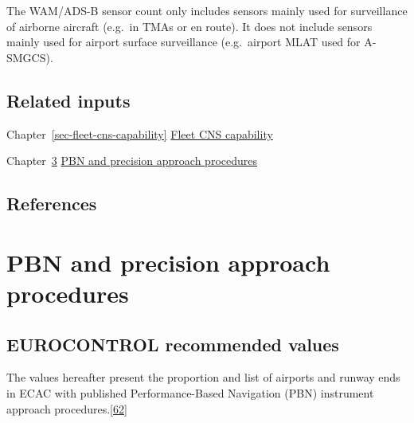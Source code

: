 \documentclass[
  11pt,
  a4paper,
]{book}
\begin{document}
The WAM/ADS-B sensor count only includes sensors mainly used for
surveillance of airborne aircraft (e.g.~in TMAs or en route). It does
not include sensors mainly used for airport surface surveillance
(e.g.~airport MLAT used for A-SMGCS).

\hypertarget{related-inputs-24}{%
\section{Related inputs}\label{related-inputs-24}}

Chapter~\ref{sec-fleet-cns-capability}
\protect\hyperlink{sec-fleet-cns-capability}{Fleet CNS capability}

Chapter~\ref{sec-pbn-and-precision-approach-procedures}
\protect\hyperlink{sec-pbn-and-precision-approach-procedures}{PBN and
precision approach procedures}

\hypertarget{references-29}{%
\section{References}\label{references-29}}

\hypertarget{sec-pbn-and-precision-approach-procedures}{%
\chapter{PBN and precision approach
procedures}\label{sec-pbn-and-precision-approach-procedures}}

\hypertarget{eurocontrol-recommended-values-31}{%
\section{EUROCONTROL recommended
values}\label{eurocontrol-recommended-values-31}}

The values hereafter present the proportion and list of airports and
runway ends in ECAC with published Performance-Based Navigation (PBN)
instrument approach
procedures.\protect\hyperlink{ref-pbn:tool}{{[}62{]}}
\end{document}
